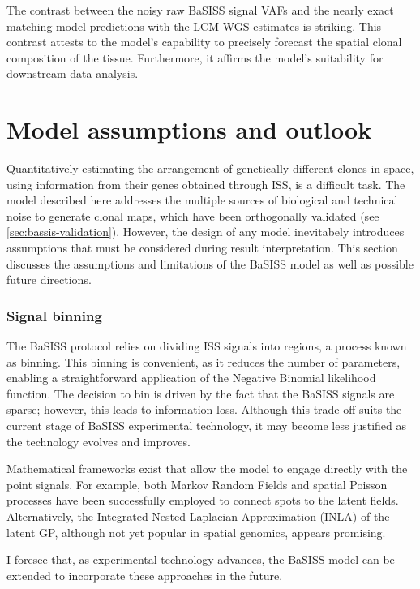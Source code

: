 The contrast between the noisy raw \ac{BaSISS} signal VAFs and the nearly exact matching model predictions with the \ac{LCM}-\ac{WGS} estimates is striking. This contrast attests to the model's capability to precisely forecast the spatial clonal composition of the tissue. Furthermore, it affirms the model's suitability for downstream data analysis.

\section{Model assumptions and outlook}

Quantitatively estimating the arrangement of genetically different clones in space, using information from their genes obtained through \ac{ISS}, is a difficult task. The model described here addresses the multiple sources of biological and technical noise to generate clonal maps, which have been orthogonally validated (see \cref{sec:bassis-validation}). However, the design of any model inevitabely introduces assumptions that must be considered during result interpretation. This section discusses the assumptions and limitations of the \ac{BaSISS} model as well as possible future directions.

\subsubsection*{Signal binning}
The \ac{BaSISS} protocol relies on dividing \ac{ISS} signals into regions, a process known as binning. This binning is convenient, as it reduces the number of parameters, enabling a straightforward application of the Negative Binomial likelihood function. The decision to bin is driven by the fact that the \ac{BaSISS} signals are sparse; however, this leads to information loss. Although this trade-off suits the current stage of \ac{BaSISS} experimental technology, it may become less justified as the technology evolves and improves.

Mathematical frameworks exist that allow the model to engage directly with the point signals. For example, both Markov Random Fields \parencite{Petukhov2022-pv} and spatial Poisson processes \parencite{Qian2020-hy} have been successfully employed to connect spots to the latent fields. Alternatively, the Integrated Nested Laplacian Approximation (INLA) \parencite{Rue2009-an} of the latent \ac{GP}, although not yet popular in spatial genomics, appears promising.

I foresee that, as experimental technology advances, the \ac{BaSISS} model can be extended to incorporate these approaches in the future.


